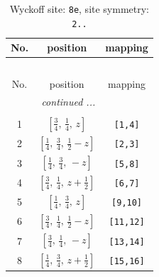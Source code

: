 \documentclass[fleqn,8pt]{jsarticle}
\begin{document}
\renewcommand{\arraystretch}{1.2}
\begin{longtable}{ccc}
\caption{Wyckoff site: {\tt 8e}, site symmetry: {\tt 2..}}
 \\
 \hline \hline
No. & position & mapping \\ \hline \endfirsthead

\multicolumn{2}{l}{\tablename\ \thetable{}} \\
 \hline \hline
No. & position & mapping \\ \hline \endhead

 \hline \hline
\multicolumn{2}{r}{\footnotesize\it continued ...} \\ \endfoot

 \hline \hline
\multicolumn{2}{r}{} \\ \endlastfoot

1 & $\left[ \frac{3}{4},\, \frac{1}{4},\, z \right]$ & {\tt [1,4]} \\ \hline
2 & $\left[ \frac{1}{4},\, \frac{3}{4},\, \frac{1}{2} - z \right]$ & {\tt [2,3]} \\ \hline
3 & $\left[ \frac{1}{4},\, \frac{3}{4},\, - z \right]$ & {\tt [5,8]} \\ \hline
4 & $\left[ \frac{3}{4},\, \frac{1}{4},\, z + \frac{1}{2} \right]$ & {\tt [6,7]} \\ \hline
5 & $\left[ \frac{1}{4},\, \frac{3}{4},\, z \right]$ & {\tt [9,10]} \\ \hline
6 & $\left[ \frac{3}{4},\, \frac{1}{4},\, \frac{1}{2} - z \right]$ & {\tt [11,12]} \\ \hline
7 & $\left[ \frac{3}{4},\, \frac{1}{4},\, - z \right]$ & {\tt [13,14]} \\ \hline
8 & $\left[ \frac{1}{4},\, \frac{3}{4},\, z + \frac{1}{2} \right]$ & {\tt [15,16]} \\
\end{longtable}
\renewcommand{\arraystretch}{1.2}
\end{document}
